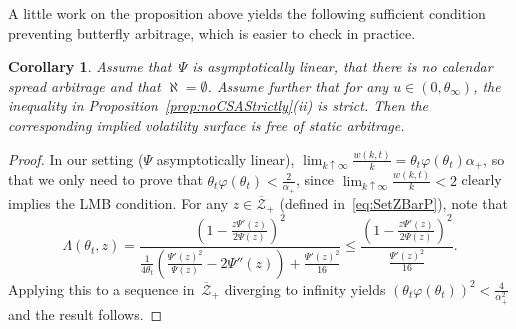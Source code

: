 \documentclass{amsart}[11pt]
\numberwithin{equation}{section}
\newtheorem{corollary}[theorem]{Corollary}
\theoremstyle{definition}
\newcommand{\Zz}{\mathcal{Z}}
\begin{document}
A little work on the proposition above yields the following sufficient condition preventing butterfly arbitrage, which is easier to check in practice.
\begin{corollary}
Assume that~$\Psi$ is asymptotically linear, that there is no calendar spread arbitrage 
and that $\aleph = \emptyset$.
Assume further that for any $u\in (0,\theta_\infty)$, the inequality in Proposition~\ref{prop:noCSAStrictly}(ii) is strict.
Then the corresponding implied volatility surface is free of static arbitrage.
\end{corollary}

\begin{proof}
In our setting ($\Psi$ asymptotically linear),
$\lim_{k \uparrow \infty} \frac{w(k,t)}{k} =  \theta_t \varphi(\theta_t) \alpha_+$,
so that we only need to prove that $\theta_t \varphi(\theta_t) < \frac{2}{\alpha_+}$, 
since $\lim_{k\uparrow \infty}\frac{w(k,t)}{k}<2$ clearly implies the LMB condition.
For any $z \in \overline{\Zz}_+$ (defined in~\eqref{eq:SetZBarP}), note that
$$
\Lambda(\theta_t, z) = \frac{\left(1-\frac{z\Psi'(z)}{2\Psi(z)}\right)^2}
{\frac{1}{4 \theta_t} \left(\frac{\Psi'(z)^{2}}{\Psi(z)}-2\Psi''(z)\right)+\frac{\Psi'(z)^{2}}{16}}
\leq \frac{\left(1-\frac{z\Psi'(z)}{2\Psi(z)}\right)^2}{\frac{\Psi'(z)^{2}}{16}}.
$$
Applying this to a sequence in~$\overline{\Zz}_+$ diverging to infinity yields
$(\theta_t \varphi(\theta_t) )^2 < \frac{4}{\alpha_+^2}$
and the result follows.
\end{proof}


\end{document}
